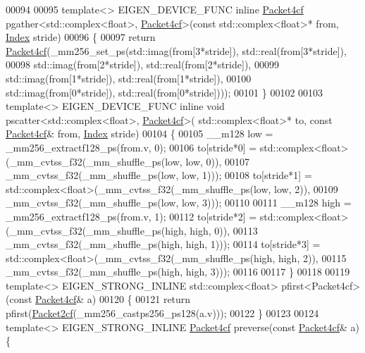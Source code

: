 \begin{DoxyCode}
00094 
00095 \textcolor{keyword}{template}<> EIGEN\_DEVICE\_FUNC \textcolor{keyword}{inline} \hyperlink{struct_eigen_1_1internal_1_1_packet4cf}{Packet4cf} pgather<std::complex<float>, 
      \hyperlink{struct_eigen_1_1internal_1_1_packet4cf}{Packet4cf}>(\textcolor{keyword}{const} std::complex<float>* from, \hyperlink{namespace_eigen_a62e77e0933482dafde8fe197d9a2cfde}{Index} stride)
00096 \{
00097   \textcolor{keywordflow}{return} \hyperlink{struct_eigen_1_1internal_1_1_packet4cf}{Packet4cf}(\_mm256\_set\_ps(std::imag(from[3*stride]), std::real(from[3*stride]),
00098                                  std::imag(from[2*stride]), std::real(from[2*stride]),
00099                                  std::imag(from[1*stride]), std::real(from[1*stride]),
00100                                  std::imag(from[0*stride]), std::real(from[0*stride])));
00101 \}
00102 
00103 \textcolor{keyword}{template}<> EIGEN\_DEVICE\_FUNC \textcolor{keyword}{inline} \textcolor{keywordtype}{void} pscatter<std::complex<float>, \hyperlink{struct_eigen_1_1internal_1_1_packet4cf}{Packet4cf}>(
      std::complex<float>* to, \textcolor{keyword}{const} \hyperlink{struct_eigen_1_1internal_1_1_packet4cf}{Packet4cf}& from, \hyperlink{namespace_eigen_a62e77e0933482dafde8fe197d9a2cfde}{Index} stride)
00104 \{
00105   \_\_m128 low = \_mm256\_extractf128\_ps(from.v, 0);
00106   to[stride*0] = std::complex<float>(\_mm\_cvtss\_f32(\_mm\_shuffle\_ps(low, low, 0)),
00107                                      \_mm\_cvtss\_f32(\_mm\_shuffle\_ps(low, low, 1)));
00108   to[stride*1] = std::complex<float>(\_mm\_cvtss\_f32(\_mm\_shuffle\_ps(low, low, 2)),
00109                                      \_mm\_cvtss\_f32(\_mm\_shuffle\_ps(low, low, 3)));
00110 
00111   \_\_m128 high = \_mm256\_extractf128\_ps(from.v, 1);
00112   to[stride*2] = std::complex<float>(\_mm\_cvtss\_f32(\_mm\_shuffle\_ps(high, high, 0)),
00113                                      \_mm\_cvtss\_f32(\_mm\_shuffle\_ps(high, high, 1)));
00114   to[stride*3] = std::complex<float>(\_mm\_cvtss\_f32(\_mm\_shuffle\_ps(high, high, 2)),
00115                                      \_mm\_cvtss\_f32(\_mm\_shuffle\_ps(high, high, 3)));
00116 
00117 \}
00118 
00119 \textcolor{keyword}{template}<> EIGEN\_STRONG\_INLINE std::complex<float>  pfirst<Packet4cf>(\textcolor{keyword}{const} 
      \hyperlink{struct_eigen_1_1internal_1_1_packet4cf}{Packet4cf}& a)
00120 \{
00121   \textcolor{keywordflow}{return} pfirst(\hyperlink{struct_eigen_1_1internal_1_1_packet2cf}{Packet2cf}(\_mm256\_castps256\_ps128(a.v)));
00122 \}
00123 
00124 \textcolor{keyword}{template}<> EIGEN\_STRONG\_INLINE \hyperlink{struct_eigen_1_1internal_1_1_packet4cf}{Packet4cf} preverse(\textcolor{keyword}{const} \hyperlink{struct_eigen_1_1internal_1_1_packet4cf}{Packet4cf}& a) \{

\end{DoxyCode}
